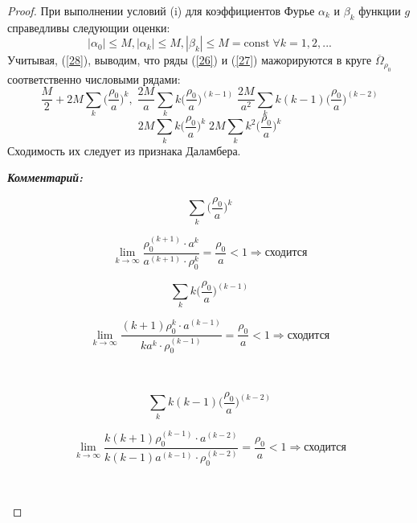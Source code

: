 \documentclass[14pt, a4paper]{extarticle}
\let\oldref\ref
\renewcommand{\ref}[1]{(\oldref{#1})}
\begin{document}
\begin{proof}
     			При выполнении условий (i) для коэффициентов Фурье $\alpha_k$ и $\beta_k$ функции $g$ справедливы следующии оценки:
     			\begin{equation}
					| \alpha_0 | \leq  M, | \alpha_k| \leq  M, |\beta_k| \leq M = \text{const} \; \forall k = 1, 2, ... \label{28}
     			\end{equation}
     			Учитывая, \ref{28}, выводим, что ряды \ref{26} и \ref{27} мажорируются в круге $\overline{\Omega}_{\rho_0}$ соответственно числовыми рядами: 
      		  	\begin{equation*}
    		  		\dfrac{M}{2} + 2M \sum_{k} \Big( \dfrac{\rho_0}{a} \Big)^k , \; \dfrac{2M}{a}\sum_{k} k \Big( \dfrac{\rho_0}{a} \Big)^{(k-1)} \; \dfrac{2M}{a^2}\sum_{k} k(k-1) \Big( \dfrac{\rho_0}{a} \Big)^{(k-2)}
    		  	\end{equation*}
      		  	\begin{equation*}
    		  		 2M \sum_{k} k \Big( \dfrac{\rho_0}{a} \Big)^{k} \; 2M \sum_{k} k^2 \Big( \dfrac{\rho_0}{a} \Big)^{k}
    		  	\end{equation*}
    		  	Сходимость их следует из признака Даламбера.
    		  	\begin{framed}
  				\textit{\textbf{Комментарий:}}

    		  		\begin{minipage}{0.20\textwidth}
    		  			\[ \sum_{k} \Big( \dfrac{\rho_0}{a} \Big)^k \]
    		  		\end{minipage}
					\hfill
					\begin{minipage}{0.75\textwidth}
						\[ \lim_{k \rightarrow \infty} \dfrac{\rho^{(k+1)}_0 \cdot a^k}{a^{(k+1)} \cdot \rho^k_0} = \dfrac{\rho_0}{a} < 1  \Rightarrow \textit{сходится} \]
					\end{minipage}
					
					\begin{minipage}{0.20\textwidth}
						\[ \sum_{k} k \Big( \dfrac{\rho_0}{a} \Big)^{(k-1)} \]
					\end{minipage}
					\hfill
					\begin{minipage}{0.75\textwidth}
						\[ \lim_{k \rightarrow \infty} \dfrac{(k+1) \rho^{k}_0 \cdot a^{(k-1)}}{k a^{k} \cdot \rho^{(k-1)}_0} = \dfrac{\rho_0}{a} < 1  \Rightarrow \textit{сходится} \]
					\end{minipage}\\
					
					\begin{minipage}{0.20\textwidth}
						\[ \sum_{k} k(k-1) \Big( \dfrac{\rho_0}{a} \Big)^{(k-2)} \]
					\end{minipage}
					\hfill
					\begin{minipage}{0.75\textwidth}
						\[ \lim_{k \rightarrow \infty} \dfrac{k(k+1) \rho^{(k-1)}_0 \cdot a^{(k-2)}}{k(k-1) a^{(k-1)} \cdot \rho^{(k-2)}_0} = \dfrac{\rho_0}{a} < 1  \Rightarrow \textit{сходится} \]
					\end{minipage}\\
					

\end{framed}
\end{proof}
\end{document}
